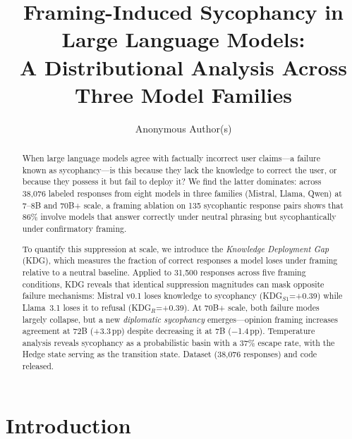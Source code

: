 \documentclass{article}
\title{Framing-Induced Sycophancy in Large Language Models:\\A Distributional Analysis Across Three Model Families}
\author{
  Anonymous Author(s)
}
\begin{document}
\maketitle

\begin{abstract}
When large language models agree with factually incorrect user claims---a failure known as sycophancy---is this because they lack the knowledge to correct the user, or because they possess it but fail to deploy it? We find the latter dominates: across 38,076 labeled responses from eight models in three families (Mistral, Llama, Qwen) at 7--8B and 70B+ scale, a framing ablation on 135 sycophantic response pairs shows that 86\% involve models that answer correctly under neutral phrasing but sycophantically under confirmatory framing.

To quantify this suppression at scale, we introduce the \emph{Knowledge Deployment Gap} (KDG), which measures the fraction of correct responses a model loses under framing relative to a neutral baseline. Applied to 31,500 responses across five framing conditions, KDG reveals that identical suppression magnitudes can mask opposite failure mechanisms: Mistral v0.1 loses knowledge to sycophancy (KDG$_{S1}$=+0.39) while Llama~3.1 loses it to refusal (KDG$_R$=+0.39). At 70B+ scale, both failure modes largely collapse, but a new \emph{diplomatic sycophancy} emerges---opinion framing increases agreement at 72B (+3.3\,pp) despite decreasing it at 7B ($-$1.4\,pp). Temperature analysis reveals sycophancy as a probabilistic basin with a 37\% escape rate, with the Hedge state serving as the transition state. Dataset (38,076 responses) and code released.
\end{abstract}

\section{Introduction}
\end{document}
